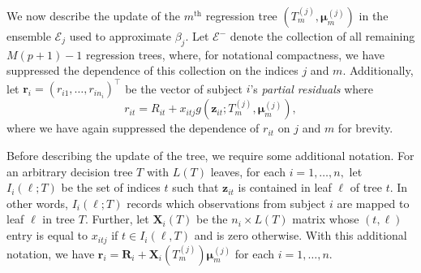 \documentclass[11pt]{article}
\begin{document}
\onehalfspacing

\def\by{\bm{y}} %
\def\bY{\bm{Y}} %

\def\bbeta{\boldsymbol{\beta}}
\def\bgamma{\boldsymbol{\gamma}}

\def\beps{\boldsymbol{\varepsilon}}
\def\bx{\bm{x}}
\def\bX{\bm{X}}
\def\bmu{\boldsymbol{\mu}}
\def\br{\bm{r}}

\def\brf{\bm{brf}}
\def\brp{\bm{brp}}
\def\balpha{\boldsymbol{\alpha}}
\def\bz{\bm{z}}
\def\bsigma{\boldsymbol{\sigma}}
\def\bone{\boldsymbol{1}}

\def\btheta{\boldsymbol{\theta}}
\def\bTheta{\boldsymbol{\Theta}}
\def\balpha{\boldsymbol{\alpha}}

\def\bE{\boldsymbol{\mathcal{E}}} %

\def\bR{\bm{R}}

\def\R{\mathbb{R}}
\def\P{\mathbb{P}}
\def\E{\mathbb{E}}

\def\N{\mathcal{N}}

\def\bSigma{\boldsymbol{\Sigma}}
\def\bOmega{\boldsymbol{\Omega}}

We now describe the update of the $m^{\text{th}}$ regression tree $(T_{m}^{(j)}, \bmu^{(j)}_{m})$ in the ensemble $\mathcal{E}_{j}$ used to approximate $\beta_{j}.$
Let $\bE^{-}$ denote the collection of all remaining $M(p+1) - 1$ regression trees, where, for notational compactness, we have suppressed the dependence of this collection on the indices $j$ and $m.$
Additionally, let $\br_{i} = (r_{i1}, \ldots, r_{in_{i}})^{\top}$ be the vector of subject $i$'s \textit{partial residuals} where
$$
r_{it} = R_{it} + x_{itj}g(\bz_{it}; T_{m}^{(j)}, \bmu_{m}^{(j)}),
$$
where we have again suppressed the dependence of $r_{it}$ on $j$ and $m$ for brevity.

Before describing the update of the tree, we require some additional notation.
For an arbitrary decision tree $T$ with $L(T)$ leaves, for each $i = 1, \ldots, n,$ let $I_{i}(\ell;T)$ be the set of indices $t$ such that $\bz_{it}$ is contained in leaf $\ell$ of tree $t.$
In other words, $I_{i}(\ell;T)$ records which observations from subject $i$ are mapped to leaf $\ell$ in tree $T.$
Further, let $\bX_{i}(T)$ be the $n_{i} \times L(T)$ matrix whose $(t,\ell)$ entry is equal to $x_{itj}$ if $t \in I_{i}(\ell,T)$ and is zero otherwise.
With this additional notation, we have $\br_{i} = \bR_{i} + \bX_{i}(T^{(j)}_{m})\bmu^{(j)}_{m}$ for each $i = 1, \ldots, n.$
\end{document}

